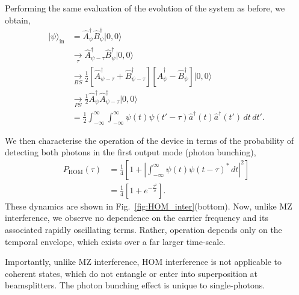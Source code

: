 \documentclass[aps, rmp, twocolumn, amsmath, amssymb, nofootinbib, superscriptaddress, longbibliography, floatfix, table-of-contents, eqsecnum]{revtex4-1}
\newcommand{\ket}[1]{|#1\rangle}
\begin{document}
Performing the same evaluation of the evolution of the system as before, we obtain,
\begin{align}
	\ket\psi_\text{in} &= \hat{A}^\dag_\psi \hat{B}^\dag_\psi \ket{0,0} \nonumber \\
	&\underset{\tau}{\to} \hat{A}^\dag_{\psi-\tau} \hat{B}^\dag_\psi \ket{0,0} \nonumber \\
	&\underset{BS}{\to} \frac{1}{2} [\hat{A}^\dag_{\psi-\tau} + \hat{B}^\dag_{\psi-\tau}] [\hat{A}^\dag_\psi - \hat{B}^\dag_\psi] \ket{0,0} \nonumber \\
	&\underset{PS}{\to} \frac{1}{2} \hat{A}^\dag_\psi \hat{A}^\dag_{\psi-\tau} \ket{0,0} \nonumber \\
	&= \frac{1}{2} \int_{-\infty}^\infty \int_{-\infty}^\infty \psi(t)\psi(t'-\tau)\hat{a}^\dag(t)\hat{a}^\dag(t')\,dt\,dt'.
\end{align}

We then characterise the operation of the device in terms of the probability of detecting both photons in the first output mode (photon bunching),
\begin{align}
	P_\text{HOM}(\tau) &= \frac{1}{4} \left[1 + \left|\int_{-\infty}^\infty \psi(t)\psi(t-\tau)^*\,dt\right|^2 \right] \nonumber \\
	&= \frac{1}{4}\left[ 1 + e^{-\frac{\tau^2}{\sigma}} \right].
\end{align}
These dynamics are shown in Fig.~\ref{fig:HOM_inter}(bottom). Now, unlike MZ interference, we observe no dependence on the carrier frequency and its associated rapidly oscillating terms. Rather, operation depends only on the temporal envelope, which exists over a far larger time-scale.

Importantly, unlike MZ interference, HOM interference is not applicable to coherent states, which do not entangle or enter into superposition at beamsplitters. The photon bunching effect is unique to single-photons.
\end{document}
